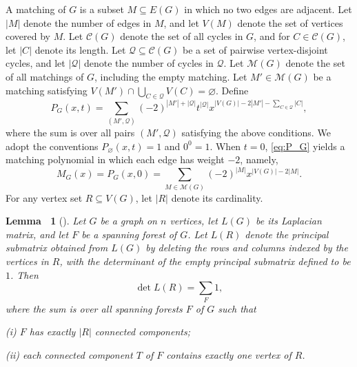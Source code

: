 \documentclass[11pt, a4paper]{article}
\theoremstyle{plain}
\newtheorem{lemma}{Lemma\ }[section]
\begin{document}
A matching of $G$ is a subset $M \subseteq E(G)$ in which no two edges are adjacent.
Let $|M|$ denote the number of edges in $M$, and let $V(M)$ denote the set of vertices covered by $M$.
Let $\mathcal{C}(G)$ denote the set of all cycles in $G$, and for $C \in \mathcal{C}(G)$, let $|C|$ denote its length.
Let $\mathcal{Q} \subseteq \mathcal{C}(G)$ be a set of pairwise vertex-disjoint cycles, and let $|\mathcal{Q}|$ denote the number of cycles in $\mathcal{Q}$.
Let $\mathcal{M}(G)$ denote the set of all matchings of $G$, including the empty matching.
Let $M' \in \mathcal{M}(G)$ be a matching satisfying $V(M') \cap \bigcup_{C \in \mathcal{Q}} V(C) = \varnothing$.
Define
\begin{equation}\label{eq:P_G}
P_G(x,t) = \sum_{(M',\mathcal{Q})} (-2)^{|M'|+|\mathcal{Q}|} t^{|\mathcal{Q}|} x^{|V(G)|-2|M'|-\sum_{C\in\mathcal{Q}}|C|},
\end{equation}
where the sum is over all pairs $(M',\mathcal{Q})$ satisfying the above conditions.
We adopt the conventions $P_{\varnothing}(x,t)=1$ and $0^0=1$.
When $t=0$, \eqref{eq:P_G} yields a matching polynomial in which each edge has weight $-2$, namely,
\[
M_G(x) = P_G(x,0) = \sum_{M \in \mathcal{M}(G)} (-2)^{|M|} x^{|V(G)|-2|M|}.
\]
For any vertex set $R \subseteq V(G)$, let $|R|$ denote its cardinality.
\begin{lemma}[\cite{Chaiken1982}]\label{lem:10}
Let $G$ be a graph on $n$ vertices, let $L(G)$ be its Laplacian matrix, and let $F$ be a spanning forest of $G$.
Let $L(R)$ denote the principal submatrix obtained from $L(G)$ by deleting the rows and columns indexed by the vertices in $R$, with the determinant of the empty principal submatrix defined to be $1$.
Then
\[
\det L(R) = \sum_{F} 1,
\]
where the sum is over all spanning forests $F$ of $G$ such that

\textup{(i)} $F$ has exactly $|R|$ connected components;

\textup{(ii)} each connected component $T$ of $F$ contains exactly one vertex of $R$.
\end{lemma}
\end{document}
